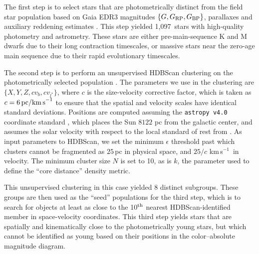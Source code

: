 \documentclass[12pt,twocolumn]{aastex63}
\newcommand{\npms}{1{,}097} %
\newcommand{\kms}{\,km\,s$^{-1}$}
\begin{document}
The first step is to select stars that are photometrically distinct
from the field star population based on Gaia EDR3 magnitudes $\{G,
G_{\rm RP}, G_{\rm BP}\}$, parallaxes and auxiliary reddening
estimates \citep{lallement_gaia-2mass_2019}.  This step yielded \npms\
stars with high-quality photometry and astrometry.  These stars are
either pre-main-sequence K and M dwarfs due to their long contraction
timescales, or massive stars near the zero-age main sequence due to
their rapid evolutionary timescales.

The second step is to perform an unsupervised HDBScan clustering on
the photometrically selected population
\citep{campello_hierarchical_2015,mcinnes_hdbscan_2017}.  The
parameters we use in the clustering are $\{ X, Y, Z, c v_b, c v_{l^*}
\} $, where $c$ is the size-velocity corrective factor, which is taken
as $c=6\,{\rm pc / km\,s}^{-1}$ to ensure that the spatial and
velocity scales have identical standard deviations.  Positions are
computed assuming the \texttt{astropy v4.0} coordinate standard
\citep{astropy_2018}, which places the Sun $8122$ pc from the galactic
center, and assumes the solar velocity with respect to the local
standard of rest from \citet{schonrich_local_2010}.  As input
parameters to HDBScan, we set the minimum $\epsilon$ threshold past
which clusters cannot be fragmented as $25$\,pc in physical space, and
$25/c$\,\kms\ in velocity.  The minimum cluster size $N$ is set to 10, as
is $k$, the parameter used to define the ``core distance'' density
metric. 

This unsupervised clustering in this case yielded 8 distinct subgroups.
These groups are then used as the ``seed'' populations for the third
step, which is to search for objects at least as close to the 10$^{\rm
th}$ nearest HDBScan-identified member in space-velocity coordinates.
This third step yields stars that are spatially and kinematically
close to the photometrically young stars, but which cannot be
identified as young based on their positions in the color--absolute
magnitude diagram.
\end{document}
